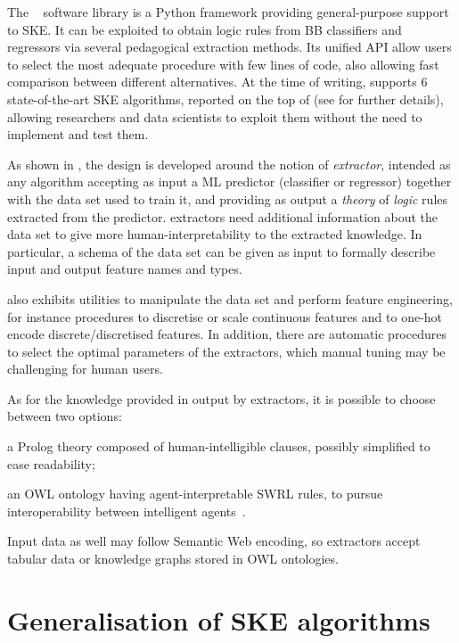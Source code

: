 \documentclass[
]{ceurart}
\begin{document}


The \psyke{}~\cite{psyke-woa2021,psyke-ia2022} software library is a Python framework providing general-purpose support to SKE.
%
It can be exploited to obtain logic rules from BB classifiers and regressors via several pedagogical extraction methods.
%
Its unified API allow users to select the most adequate procedure with few lines of code, also allowing fast comparison between different alternatives.
%
At the time of writing, \psyke{} supports 6 state-of-the-art SKE algorithms, reported on the top of  (see  for further details), allowing researchers and data scientists to exploit them without the need to implement and test them.

As shown in , the \psyke{} design is developed around the notion of \emph{extractor}, intended as any algorithm accepting as input a ML predictor (classifier or regressor) together with the data set used to train it, and providing as output a \emph{theory} of \emph{logic} rules extracted from the predictor.
%
\psyke{} extractors need additional information about the data set to give more human-interpretability to the extracted knowledge.
In particular, a schema of the data set can be given as input to formally describe input and output feature names and types.

\psyke{} also exhibits utilities to manipulate the data set and perform feature engineering, for instance procedures to discretise or scale continuous features and to one-hot encode discrete/discretised features.
%
In addition, there are automatic procedures to select the optimal parameters of the extractors, which manual tuning may be challenging for human users.

As for the knowledge provided in output by extractors, it is possible to choose between two options:
\begin{inlinelist}
	\item a Prolog theory composed of human-intelligible clauses, possibly simplified to ease readability;
	\item an OWL ontology having agent-interpretable SWRL rules, to pursue interoperability between intelligent agents~\cite{psyke-extraamas2022}.
\end{inlinelist}
%
Input data as well may follow Semantic Web encoding, so \psyke{} extractors accept tabular data or knowledge graphs stored in OWL ontologies.

\section{Generalisation of SKE algorithms}\label{sec:contribution}
\end{document}
